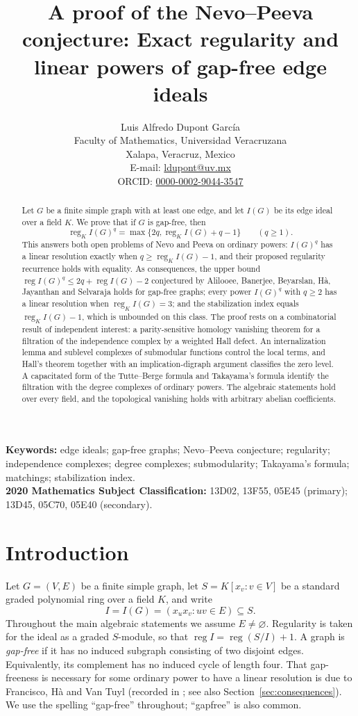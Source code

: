 \documentclass[11pt,a4paper]{article}
\title{\bfseries A proof of the Nevo--Peeva conjecture: Exact regularity and linear powers of gap-free edge ideals}
\author{Luis Alfredo Dupont Garc\'ia\\[3pt]
\small Faculty of Mathematics, Universidad Veracruzana\\
\small Xalapa, Veracruz, Mexico\\[3pt]
\small E-mail: \href{mailto:ldupont@uv.mx}{ldupont@uv.mx}\\
\small ORCID: \href{https://orcid.org/0000-0002-9044-3547}{0000-0002-9044-3547}}
\date{}
\theoremstyle{definition}
\newcommand{\reg}{\operatorname{reg}}
\begin{document}
\maketitle
\thispagestyle{plain}
\begin{abstract}
Let $G$ be a finite simple graph with at least one edge, and let $I(G)$ be its edge ideal over a field $K$. We prove that if $G$ is gap-free, then
\[
 \reg_K I(G)^q=\max\{2q,\reg_K I(G)+q-1\}\qquad(q\geq1).
\]
This answers both open problems of Nevo and Peeva on ordinary powers: $I(G)^q$ has a linear resolution exactly when $q\geq\reg_K I(G)-1$, and their proposed regularity recurrence holds with equality. As consequences, the upper bound $\reg I(G)^q\leq 2q+\reg I(G)-2$ conjectured by Alilooee, Banerjee, Beyarslan, H\`a, Jayanthan and Selvaraja holds for gap-free graphs; every power $I(G)^q$ with $q\geq2$ has a linear resolution when $\reg_K I(G)=3$; and the stabilization index equals $\reg_K I(G)-1$, which is unbounded on this class. The proof rests on a combinatorial result of independent interest: a parity-sensitive homology vanishing theorem for a filtration of the independence complex by a weighted Hall defect. An internalization lemma and sublevel complexes of submodular functions control the local terms, and Hall's theorem together with an implication-digraph argument classifies the zero level. A capacitated form of the Tutte--Berge formula and Takayama's formula identify the filtration with the degree complexes of ordinary powers. The algebraic statements hold over every field, and the topological vanishing holds with arbitrary abelian coefficients.
\end{abstract}
\noindent\textbf{Keywords:} edge ideals; gap-free graphs; Nevo--Peeva conjecture; regularity; independence complexes; degree complexes; submodularity; Takayama's formula; matchings; stabilization index.\\
\textbf{2020 Mathematics Subject Classification:} 13D02, 13F55, 05E45 (primary); 13D45, 05C70, 05E40 (secondary).

\section{Introduction}
Let $G=(V,E)$ be a finite simple graph, let $S=K[x_v:v\in V]$ be a standard graded polynomial ring over a field $K$, and write
\[
 I=I(G)=(x_ux_v:uv\in E)\subseteq S.
\]
Throughout the main algebraic statements we assume $E\ne\varnothing$. Regularity is taken for the ideal as a graded $S$-module, so that $\reg I=\reg(S/I)+1$. A graph is \emph{gap-free} if it has no induced subgraph consisting of two disjoint edges. Equivalently, its complement has no induced cycle of length four. That gap-freeness is necessary for some ordinary power to have a linear resolution is due to Francisco, H\`a and Van Tuyl (recorded in \cite[Proposition 1.8]{NP}; see also Section~\ref{sec:consequences}). We use the spelling ``gap-free'' throughout; ``gapfree'' is also common.
\end{document}
